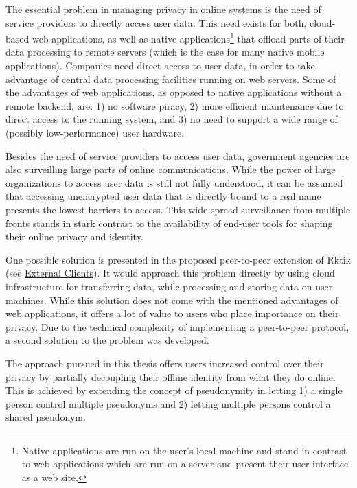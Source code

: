 
The essential problem in managing privacy in online systems is the need
of service providers to directly access user data. This need exists for
both, cloud-based web applications, as well as native
applications\footnote{Native applications are run on the user's local
  machine and stand in contrast to web applications which are run on a
  server and present their user interface as a web site.} that offload
parts of their data processing to remote servers (which is the case for
many native mobile applications). Companies need direct access to user
data, in order to take advantage of central data processing facilities
running on web servers. Some of the advantages of web applications, as
opposed to native applications without a remote backend, are: 1) no
software piracy, 2) more efficient maintenance due to direct access to
the running system, and 3) no need to support a wide range of (possibly
low-performance) user hardware.

Besides the need of service providers to access user data, government
agencies are also surveilling large parts of online communications.
While the power of large organizations to access user data is still not
fully understood, it can be assumed that accessing unencrypted user data
that is directly bound to a real name presents the lowest barriers to
access. This wide-spread surveillance from multiple fronts stands in
stark contrast to the availability of end-user tools for shaping their
online privacy and identity.

One possible solution is presented in the proposed peer-to-peer
extension of Rktik (see \hyperref[external-clients]{External Clients}).
It would approach this problem directly by using cloud infrastructure
for transferring data, while processing and storing data on user
machines. While this solution does not come with the mentioned
advantages of web applications, it offers a lot of value to users who
place importance on their privacy. Due to the technical complexity of
implementing a peer-to-peer protocol, a second solution to the problem
was developed.

The approach pursued in this thesis offers users increased control over
their privacy by partially decoupling their offline identity from what
they do online. This is achieved by extending the concept of
pseudonymity in letting 1) a single person control multiple pseudonyms
and 2) letting multiple persons control a shared pseudonym.

